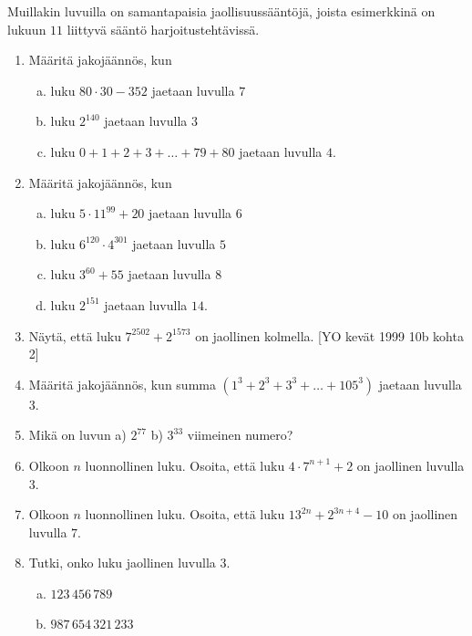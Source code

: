 Muillakin luvuilla on samantapaisia jaollisuussääntöjä, joista esimerkkinä on lukuun $11$ liittyvä sääntö harjoitustehtävissä.




\Harjoitustehtavat

\begin{enumerate}

\item Määritä jakojäännös, kun
\begin{enumerate}[a)]
\item luku $80 \cdot 30 - 352$ jaetaan luvulla $7$
\item luku $2^{140}$ jaetaan luvulla $3$
\item luku $0+1+2+3+ \ldots + 79 + 80$ jaetaan luvulla $4$.
\end{enumerate}

\item Määritä jakojäännös, kun
\begin{enumerate}[a)]
\item luku $5 \cdot 11^{99} + 20$ jaetaan luvulla $6$
\item luku $6^{120} \cdot 4^{301}$ jaetaan luvulla $5$
\item luku $3^{60} + 55$ jaetaan luvulla $8$
\item luku $2^{151}$ jaetaan luvulla $14$.
\end{enumerate}

\item
Näytä, että luku $7^{2502} + 2^{1573}$ on jaollinen kolmella. [YO kevät 1999 10b kohta 2]

\item Määritä jakojäännös, kun summa $(1^3 + 2^3 + 3^3 + \ldots + 105^3)$ jaetaan luvulla $3$.

\item Mikä on luvun a) $2^{77}$ b) $3^{33}$ viimeinen numero?

\item Olkoon $n$ luonnollinen luku. Osoita, että luku $4\cdot 7^{n+1}+2$ on jaollinen luvulla $3$.

\item Olkoon $n$ luonnollinen luku. Osoita, että luku $13^{2n} + 2^{3n+4} - 10$ on jaollinen luvulla $7$.

\item
Tutki, onko luku jaollinen luvulla $3$.
\begin{enumerate}[a)]
\item $123\, 456\, 789$
\item $987\, 654\, 321\, 233$
\end{enumerate}


\end{enumerate}
